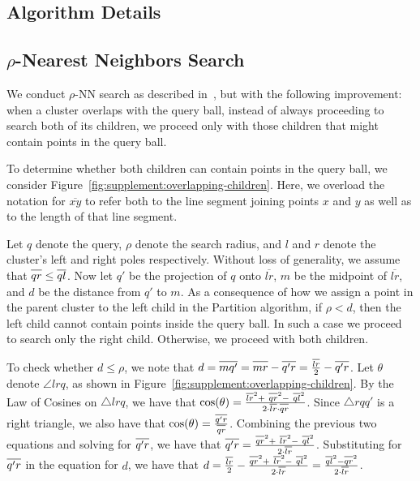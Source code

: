 \documentclass{article}
\begin{document}
\subsection{Algorithm Details}
\label{sec:supplement:algorithm-details}

\subsection{\texorpdfstring{$\rho$}{p}-Nearest Neighbors Search}

We conduct $\rho$-NN search as described in~\cite{ishaq2019clustered}, but with the following improvement:
when a cluster overlaps with the query ball, instead of always proceeding to search both of its children, we proceed only with those children that might contain points in the query ball.

To determine whether both children can contain points in the query ball, we consider Figure~\ref{fig:supplement:overlapping-children}.
Here, we overload the notation for $\overline{x y}$ to refer both to the line segment joining points $x$ and $y$ as well as to the length of that line segment.

Let $q$ denote the query, $\rho$ denote the search radius, and $l$ and $r$ denote the cluster's left and right poles respectively.
Without loss of generality, we assume that $\overline{q r \vphantom{l}} \leq \overline{q l}$.
Now let $q'$ be the projection of $q$ onto $\overline{l r}$, $m$ be the midpoint of $\overline{l r}$, and $d$ be the distance from $q'$ to $m$.
As a consequence of how we assign a point in the parent cluster to the left child in the Partition algorithm, if $\rho < d$, then the left child cannot contain points inside the query ball.
In such a case we proceed to search only the right child.
Otherwise, we proceed with both children.

To check whether $d \leq \rho$, we note that $d = \overline{m q' \vphantom{l}} = \overline{m r \vphantom{l}} - \overline{q' r \vphantom{l}} = \frac{\overline{l r}}{2} - \overline{q' r \vphantom{l}}$.
Let $\theta$ denote $\angle l r q$, as shown in Figure~\ref{fig:supplement:overlapping-children}.
By the Law of Cosines on $\triangle l r q$, we have that $\text{cos}(\theta) = \tfrac{\overline{l r}^2 + \ \overline{q r \vphantom{l}}^2 - \ \overline{q l}^2}{2 \cdot \overline{l r} \cdot \overline{q r \vphantom{l}}}$.
Since $\triangle r q q'$ is a right triangle, we also have that $\text{cos}(\theta) = \tfrac{\overline{q' r \vphantom{l}}}{\overline{q r \vphantom{l}}}$.
Combining the previous two equations and solving for $\overline{q' r \vphantom{l}}$, we have that $\overline{q' r \vphantom{l}} = \tfrac{\overline{q r \vphantom{l}}^2 + \ \overline{l r}^2 - \ \overline{q l}^2}{2 \cdot \overline{l r}}$.
Substituting for $\overline{q' r \vphantom{l}}$ in the equation for $d$, we have that $d = \tfrac{\overline{l r}}{2} - \tfrac{\overline{q r \vphantom{l}}^2 + \ \overline{l r}^2 - \ \overline{q l}^2}{2 \cdot \overline{l r}} = \tfrac{\overline{q l}^2 - \overline{q r \vphantom{l}}^2}{2 \cdot \overline{l r}}$.
\end{document}
